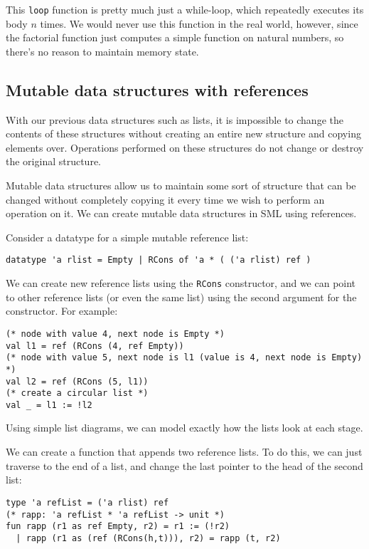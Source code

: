 \documentclass[11pt]{article}
\begin{document}
This \verb~loop~ function is pretty much just a while-loop, which repeatedly executes its body $n$ times. We would never use this function in the real world, however, since the factorial function just computes a simple function on natural numbers, so there's no reason to maintain memory state. 

\subsection{Mutable data structures with references}

With our previous data structures such as lists, it is impossible to change the contents of these structures without creating an entire new structure and copying elements over. Operations performed on these structures do not change or destroy the original structure. 

Mutable data structures allow us to maintain some sort of structure that can be changed without completely copying it every time we wish to perform an operation on it. We can create mutable data structures in SML using references.

Consider a datatype for a simple mutable reference list:
\begin{verbatim}
datatype 'a rlist = Empty | RCons of 'a * ( ('a rlist) ref )
\end{verbatim}

We can create new reference lists using the \verb~RCons~ constructor, and we can point to other reference lists (or even the same list) using the second argument for the constructor. For example:
\begin{verbatim}
(* node with value 4, next node is Empty *)
val l1 = ref (RCons (4, ref Empty))
(* node with value 5, next node is l1 (value is 4, next node is Empty) *)
val l2 = ref (RCons (5, l1))
(* create a circular list *)
val _ = l1 := !l2
\end{verbatim}

Using simple list diagrams, we can model exactly how the lists look at each stage.

We can create a function that appends two reference lists. To do this, we can just traverse to the end of a list, and change the last pointer to the head of the second list:
\begin{verbatim}
type 'a refList = ('a rlist) ref
(* rapp: 'a refList * 'a refList -> unit *)
fun rapp (r1 as ref Empty, r2) = r1 := (!r2)
  | rapp (r1 as (ref (RCons(h,t))), r2) = rapp (t, r2)
\end{verbatim}
\end{document}
